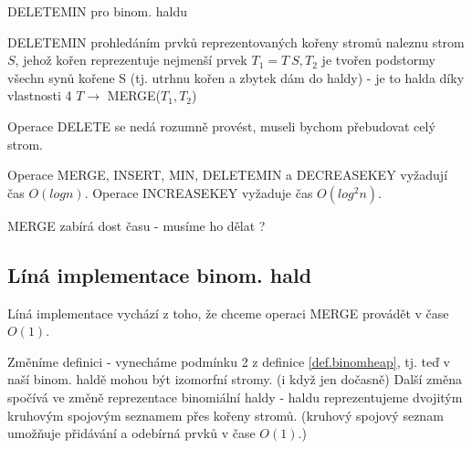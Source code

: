 \begin{algorithm}[!htb]
\caption{DELETEMIN pro binom. haldu}
\label{alg:heaps.binom.deletemin}
\begin{algorithmic}
\STATE DELETEMIN
\STATE prohledáním prvků reprezentovaných kořeny stromů naleznu strom $S$,
jehož kořen reprezentuje nejmenší prvek
\STATE $T_1 = T \ {S}, T_2$ je tvořen podstormy všechn synů kořene S
\STATE (tj. utrhnu kořen a zbytek dám do haldy) - 
	je to halda díky vlastnosti 4
\STATE $T \rightarrow$ MERGE($T_1, T_2$)
\end{algorithmic}
\end{algorithm}

\begin{pozn}
Operace DELETE se nedá rozumně provést, museli bychom přebudovat celý
strom.
\end{pozn}

\begin{theorem}
Operace MERGE, INSERT, MIN, DELETEMIN a DECREASEKEY vyžadují čas $O(log n)$.
Operace INCREASEKEY vyžaduje čas $O(log^2 n)$.
\end{theorem}

%
%

\begin{pozn}
MERGE zabírá dost času - musíme ho dělat ?
\end{pozn}


\subsection{Líná implementace binom. hald}

Líná implementace vychází z toho, že chceme operaci MERGE provádět v čase
$O(1)$.

Změníme definici - vynecháme podmínku 2 z definice \ref{def.binomheap}, 
tj. teď v naší binom. haldě mohou být izomorfní stromy. (i když jen
dočasně) Další změna
spočívá ve změně reprezentace binomiální haldy - haldu reprezentujeme
dvojitým kruhovým spojovým seznamem přes kořeny stromů. (kruhový spojový
seznam umožňuje přidávání a odebírná prvků v čase $O(1)$.)

